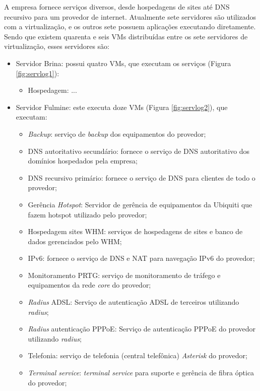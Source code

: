 A empresa fornece serviços diversos, desde hospedagens de sites até \ac{DNS} recursivo para um provedor de internet. 
Atualmente sete servidores são utilizados com a virtualização, e os outros sete possuem aplicações executando diretamente. 
Sendo que existem quarenta e seis \ac{VM}s distribuídas entre os sete servidores de virtualização, esses servidores são:
\begin{itemize}
 \item Servidor Brina: possui quatro \ac{VM}s, que executam os serviços (Figura \ref{fig:servlog1}):
 \begin{itemize}
  \item Hospedagem: ...
 \end{itemize}
 \item Servidor Fulmine: este executa doze \ac{VM}s (Figura \ref{fig:servlog2}), que executam:
 \begin{itemize}
  \item \textit{Backup}: serviço de \textit{backup} dos equipamentos do provedor;
  \item \ac{DNS} autoritativo secundário: fornece o serviço de \ac{DNS} autoritativo dos domínios hospedados pela empresa;
  \item \ac{DNS} recursivo primário: fornece o serviço de \ac{DNS} para clientes de todo o provedor;
  \item Gerência \textit{Hotspot}: Servidor de gerência de equipamentos da Ubiquiti que fazem hotspot utilizado pelo provedor;
  \item Hospedagem sites \ac{WHM}: serviços de hospedagens de sites e banco de dados gerenciados pelo \ac{WHM};
  \item \ac{IPv6}: fornece o serviço de \ac{DNS} e \ac{NAT} para navegação \ac{IPv6} do provedor;
  \item Monitoramento \ac{PRTG}: serviço de monitoramento de tráfego e equipamentos da rede \textit{core} do provedor;
  \item \textit{Radius} \ac{ADSL}: Serviço de autenticação \ac{ADSL} de terceiros utilizando \textit{radius};
  \item \textit{Radius} autenticação \ac{PPPoE}: Serviço de autenticação \ac{PPPoE} do provedor utilizando \textit{radius};
  \item Telefonia: serviço de telefonia (central telefônica) \textit{Asterisk} do provedor;
  \item \textit{Terminal service}: \textit{terminal service} para suporte e gerência de fibra óptica do provedor;
 \end{itemize}

\end{itemize}
